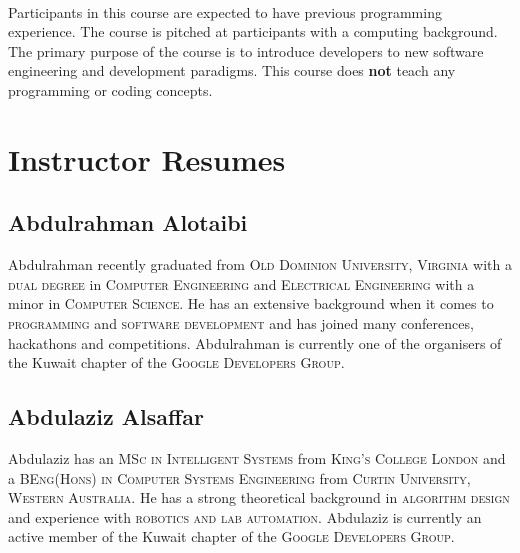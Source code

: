 \documentclass[a4paper,11pt]{article}
\begin{document}
\paragraph{}
Participants in this course are expected to have previous programming experience. The course is pitched at participants with a computing background. The primary purpose of the course is to introduce developers to new software engineering and development paradigms. This course does \textbf{not} teach any programming or coding concepts.

\pagebreak

\section{Instructor Resumes}
\subsection{Abdulrahman Alotaibi}
Abdulrahman recently graduated from \textsc{Old Dominion University, Virginia} with a \textsc{dual degree} in \textsc{Computer Engineering} and \textsc{Electrical Engineering} with a minor in \textsc{Computer Science}. He has an extensive background when it comes to \textsc{programming} and \textsc{software development} and has joined many conferences, hackathons and competitions. Abdulrahman is currently one of the organisers of the Kuwait chapter of the \textsc{Google Developers Group}.

\subsection{Abdulaziz Alsa{f}far}
Abdulaziz has an \textsc{MSc in Intelligent Systems} from \textsc{King's College London} and a \textsc{BEng(Hons) in Computer Systems Engineering} from \textsc{Curtin University, Western Australia}. He has a strong theoretical background in \textsc{algorithm design} and experience with \textsc{robotics and lab automation}. Abdulaziz is currently an active member of the Kuwait chapter of the \textsc{Google Developers Group}.
\end{document}
